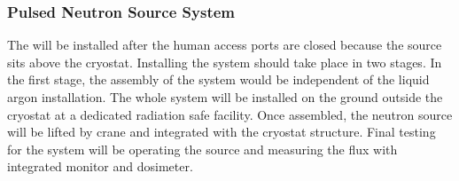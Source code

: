 \subsubsection{Pulsed Neutron Source System} 
The  will be installed after the human access ports are closed because the source sits above the cryostat. Installing the system should take place in two stages. In the first stage, the assembly of the system would be independent of the liquid argon  installation. The whole system will be installed on the ground outside the cryostat at a dedicated radiation safe facility. Once assembled, the neutron source will be lifted by crane and integrated with the cryostat structure. Final  testing for the system will be operating the source and measuring the flux with integrated monitor and dosimeter.



